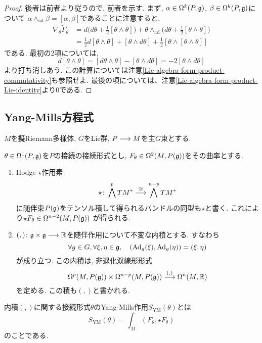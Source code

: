 \begin{proof}
後者は前者より従うので, 前者を示す.
まず, $\alpha \in \Omega^k(P, \mathfrak{g})$, $\beta \in \Omega^k(P, \mathfrak{g})$について
$\alpha\wedge_\mathrm{ad}\beta = [\alpha, \beta]$であることに注意すると,
\begin{align}
\nabla_\theta\widetilde{F}_\theta &=
d\biggl(d\theta+\frac{1}{2}[\theta\wedge\theta]\biggr) +
\theta\wedge_\mathrm{ad}\biggl(d\theta+\frac{1}{2}[\theta\wedge\theta]\biggr) \\ &=
\frac{1}{2}d[\theta\wedge\theta] +
[\theta\wedge d\theta] +
\frac{1}{2}[\theta\wedge[\theta\wedge\theta]]
\end{align}
である.
最初の2項については,
\begin{equation}
d[\theta\wedge\theta] =
[d\theta\wedge\theta] - [\theta\wedge d\theta] =
-2[\theta\wedge d\theta]
\end{equation}
より打ち消しあう.
この計算については注意\ref{Lie-algebra-form-product-commutativity}も参照せよ.
最後の項については、注意\ref{Lie-algebra-form-product-Lie-identity}より$0$である.
\end{proof}

\subsection{Yang-Mills方程式}
$M$を擬Riemann多様体,
$G$をLie群, $P \longrightarrow M$を主$G$束とする.
\begin{dfn}
  $\theta \in \Omega^1(P, \mathfrak{g})$を$P$の接続の接続形式とし,
  $F_\theta \in \Omega^2(M, P(\mathfrak{g}))$をその曲率とする.
  \begin{enumerate}
    \item Hodge $\star$作用素
          \begin{equation}
            \star \colon \bigwedge^p TM^* \stackrel{\cong}{\longrightarrow}
            \bigwedge^{n-p} TM^*
          \end{equation}
          に随伴束$P(\mathfrak{g})$をテンソル積して得られるバンドルの同型も$\star$と書く.
          これにより$\star F_\theta \in \Omega^{n-2}(M, P(\mathfrak{g}))$
          が得られる.
    \item $(,) \colon \mathfrak{g} \times \mathfrak{g} \longrightarrow \mathbb{R}$を随伴作用について不変な内積とする.
          すなわち
          \begin{equation}
            \forall g \in G, \forall \xi, \eta \in \mathfrak{g}, \quad
            (\operatorname{Ad}_g(\xi), \operatorname{Ad}_g(\eta)) = (\xi, \eta)
          \end{equation}
          が成り立つ.
          この内積は, 非退化双線形形式
          \begin{equation}
            \Omega^p(M, P(\mathfrak{g})) \times \Omega^{n-p}(M, P(\mathfrak{g}))
            \stackrel{(,)}{\longrightarrow} \Omega^n(M, \mathbb{R})
          \end{equation}
          を定める.
          この積も$(,)$と書かれる.
  \end{enumerate}
  内積$(,)$に関する接続形式$\theta$のYang-Mills作用$S_{\mathrm{YM}}(\theta)$とは
  \begin{equation}
    S_{\mathrm{YM}}(\theta) = \int_M(F_\theta,\star F_\theta)
  \end{equation}
  のことである.
\end{dfn}

